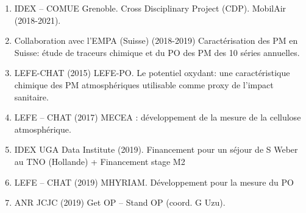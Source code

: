 \begin{enumerate}
    \item IDEX – COMUE Grenoble. Cross Disciplinary Project (CDP). MobilAir (2018-2021).
    \item Collaboration avec l’EMPA (Suisse) (2018-2019) Caractérisation des PM en Suisse: étude de traceurs chimique et du PO des PM des 10 séries annuelles. 
    \item LEFE-CHAT (2015) LEFE-PO. Le potentiel oxydant: une caractéristique chimique des PM atmosphériques utilisable comme proxy de l’impact sanitaire. 
    \item LEFE – CHAT (2017) MECEA : développement de la mesure de la cellulose atmosphérique.
    \item IDEX UGA Data Institute (2019). Financement pour un séjour de S Weber au TNO (Hollande) + Financement stage M2
    \item LEFE – CHAT (2019) MHYRIAM. Développement pour la mesure du PO 
    \item ANR JCJC (2019) Get OP – Stand OP (coord. G Uzu). 
\end{enumerate}

